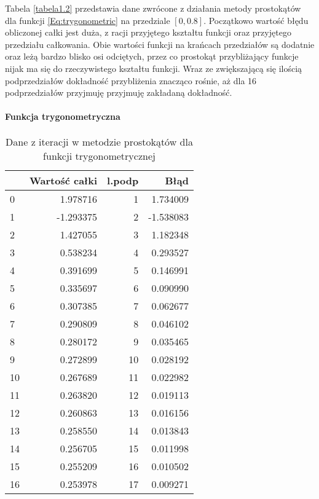 \documentclass[12pt,twoside]{article}
\begin{document}
Tabela \eqref{tabela1.2} przedstawia dane zwrócone z działania metody prostokątów dla funkcji \eqref{Eq:trygonometric} na przedziale $[0,0.8]$.
Początkowo wartość błędu obliczonej całki jest duża, z racji przyjętego kształtu funkcji oraz przyjętego przedziału całkowania. Obie wartości funkcji na krańcach przedziałów są dodatnie oraz leżą bardzo blisko osi odciętych, przez co prostokąt przybliżający funkcje nijak ma się do rzeczywistego kształtu funkcji. Wraz ze zwiększającą się ilością podprzedziałów dokładność przybliżenia znacząco rośnie, aż dla 16 podprzedziałów przyjmuję przyjmuję zakładaną dokładność.


\paragraph{Funkcja trygonometryczna}

\begin{table}[H]
\centering 
\caption{Dane z iteracji w metodzie prostokątów dla funkcji trygonometrycznej}
\label{tabela1.2}
\begin{tabular}{lrrr}
\toprule
{} &  Wartość całki &  l.podp &      Błąd \\
\midrule
0  &       1.978716 &       1 &  1.734009 \\
1  &      -1.293375 &       2 & -1.538083 \\
2  &       1.427055 &       3 &  1.182348 \\
3  &       0.538234 &       4 &  0.293527 \\
4  &       0.391699 &       5 &  0.146991 \\
5  &       0.335697 &       6 &  0.090990 \\
6  &       0.307385 &       7 &  0.062677 \\
7  &       0.290809 &       8 &  0.046102 \\
8  &       0.280172 &       9 &  0.035465 \\
9  &       0.272899 &      10 &  0.028192 \\
10 &       0.267689 &      11 &  0.022982 \\
11 &       0.263820 &      12 &  0.019113 \\
12 &       0.260863 &      13 &  0.016156 \\
13 &       0.258550 &      14 &  0.013843 \\
14 &       0.256705 &      15 &  0.011998 \\
15 &       0.255209 &      16 &  0.010502 \\
16 &       0.253978 &      17 &  0.009271 \\
\bottomrule
\end{tabular}
\end{table}
\end{document}
